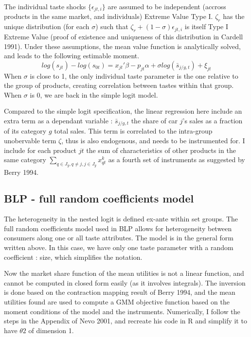 \documentclass{article}\usepackage[]{graphicx}\usepackage[]{color}
\begin{document}
The individual taste shocks $\{\epsilon_{jt,i}\}$ are assumed to be independent (accross products in the same market, and individuals) Extreme Value Type I. $\zeta_r$ has the unique distribution (for each $\sigma$) such that $\zeta_r + (1-\sigma) \epsilon_{jt,i}$ is itself Type I Extreme Value (proof of existence and uniqueness of this distribution in Cardell 1991). Under these assumptions, the mean value function is analytically solved, and leads to the following estimable moment.
\begin{equation}
log(s_{jt}) - log(s_{0t}) = x_{jt}' \beta - p_{jt} \alpha + \sigma log(\bar{s}_{j/g,t}) + \xi_{jt} 
\label{eq:nested_logit_regression}
\end{equation}
When $\sigma$ is close to 1, the only individual taste parameter is the one relative to the group of products, creating correlation between tastes within that group. When $\sigma$ is 0, we are back in the simple logit model.

Compared to the simple logit specification, the linear regression here include an extra term as a dependant variable : $\bar{s}_{j/g,t}$ the share of car $j$'s sales as a fraction of its category $g$ total sales. This term is correlated to the intra-group unobervable term $\zeta$, thus is also endogenous, and needs to be instrumented for. I include for each product $jt$ the sum of characteristics of other products in the same category $\sum \limits_{q \in J_g, q \ne j, j \in J_g} x^k_{qt}$ as a fourth set of instruments as suggested by Berry 1994. %

\subsection{BLP - full random coefficients model}
The heterogeneity in the nested logit is defined ex-ante within set groups. The full random coefficients model used in BLP allows for heterogeneity between consumers along one or all taste attributes. The model is in the general form written above. In this case, we have only one taste parameter with a random coefficient : size, which simplifies the notation. 

Now the market share function of the mean utilities is not a linear function, and cannot be computed in closed form easily (as it involves integrals). The inversion is done based on the contraction mapping result of Berry 1994, and the mean utilities found are used to compute a GMM objective function based on the moment conditions of the model and the instruments. Numerically, I follow the steps in the Appendix of Nevo 2001, and recreate his code in R and simplify it to have $\theta2$ of dimension 1.
\end{document}
